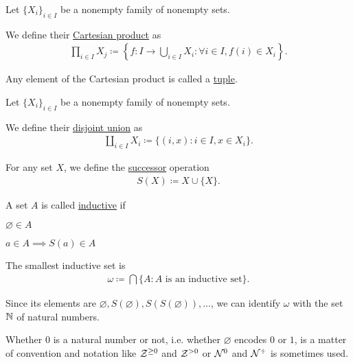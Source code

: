 \begin{definition}\label{def:cartesian_product}\cite[11]{Lectures:general_topology}
  Let $\{ X_i \}_{i \in I}$ be a nonempty family of nonempty sets.

  We define their \uline{Cartesian product} as
  \begin{align*}
    \prod_{i \in I} X_j \coloneqq \left\{ f: I \to \bigcup_{i \in I} X_i \colon \forall i \in I, f(i) \in X_i \right\}.
  \end{align*}

  Any element of the Cartesian product is called a \uline{tuple}.
\end{definition}

\begin{definition}\label{def:disjoint_union}
  Let $\{ X_i \}_{i \in I}$ be a nonempty family of nonempty sets.

  We define their \uline{disjoint union} as
  \begin{align*}
    \coprod_{i \in I} X_i \coloneqq \{ (i, x) \colon i \in I, x \in X_i \}.
  \end{align*}
\end{definition}

\begin{definition}\label{def:successor_operator}\cite[11]{Lectures:general_topology}
  For any set $X$, we define the \uline{successor} operation
  \begin{align*}
    S(X) \coloneqq X \cup \{ X \}.
  \end{align*}
\end{definition}

\begin{definition}\label{def:inductive_set}\cite[11]{Lectures:general_topology}
  A set $A$ is called \uline{inductive} if
  \begin{defenum}
    \item $\varnothing \in A$
    \item $a \in A \implies S(a) \in A$
  \end{defenum}
\end{definition}

\begin{example}\label{ex:natural_numbers_zfc}
  The smallest inductive set is
  \begin{align*}
    \omega \coloneqq \bigcap \{ A \colon A \text{ is an inductive set} \}.
  \end{align*}

  Since its elements are $\varnothing, S(\varnothing), S(S(\varnothing)), \ldots$, we can identify $\omega$ with the set $\mathbb N$ of natural numbers.

  Whether $0$ is a natural number or not, i.e. whether $\varnothing$ encodes $0$ or $1$, is a matter of convention and notation like $\mathcal Z^{\geq 0}$ and $\mathcal Z^{>0}$ or $\mathcal N^0$ and $\mathcal N^+$ is sometimes used.
\end{example}

